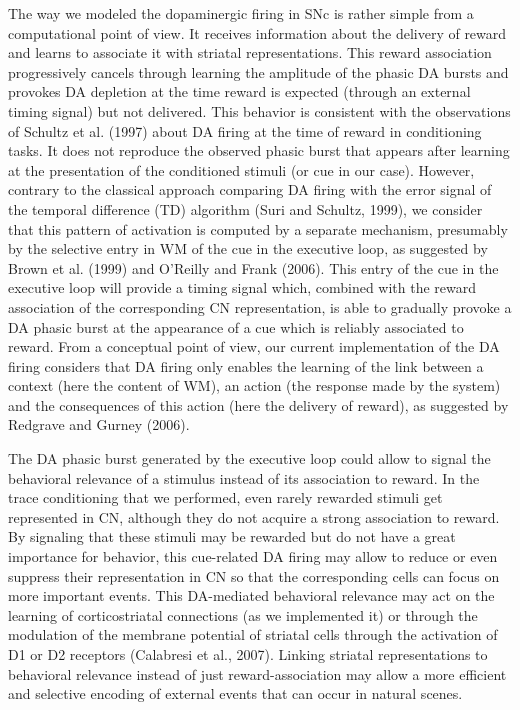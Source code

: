 \documentclass[
  11pt,
  a4paper,
]{scrbook}
\begin{document}
The way we modeled the dopaminergic firing in SNc is rather simple from
a computational point of view. It receives information about the
delivery of reward and learns to associate it with striatal
representations. This reward association progressively cancels through
learning the amplitude of the phasic DA bursts and provokes DA depletion
at the time reward is expected (through an external timing signal) but
not delivered. This behavior is consistent with the observations of
Schultz et al. (1997) about DA firing at the time of reward in
conditioning tasks. It does not reproduce the observed phasic burst that
appears after learning at the presentation of the conditioned stimuli
(or cue in our case). However, contrary to the classical approach
comparing DA firing with the error signal of the temporal difference
(TD) algorithm (Suri and Schultz, 1999), we consider that this pattern
of activation is computed by a separate mechanism, presumably by the
selective entry in WM of the cue in the executive loop, as suggested by
Brown et al. (1999) and O'Reilly and Frank (2006). This entry of the cue
in the executive loop will provide a timing signal which, combined with
the reward association of the corresponding CN representation, is able
to gradually provoke a DA phasic burst at the appearance of a cue which
is reliably associated to reward. From a conceptual point of view, our
current implementation of the DA firing considers that DA firing only
enables the learning of the link between a context (here the content of
WM), an action (the response made by the system) and the consequences of
this action (here the delivery of reward), as suggested by Redgrave and
Gurney (2006).

The DA phasic burst generated by the executive loop could allow to
signal the behavioral relevance of a stimulus instead of its association
to reward. In the trace conditioning that we performed, even rarely
rewarded stimuli get represented in CN, although they do not acquire a
strong association to reward. By signaling that these stimuli may be
rewarded but do not have a great importance for behavior, this
cue-related DA firing may allow to reduce or even suppress their
representation in CN so that the corresponding cells can focus on more
important events. This DA-mediated behavioral relevance may act on the
learning of corticostriatal connections (as we implemented it) or
through the modulation of the membrane potential of striatal cells
through the activation of D1 or D2 receptors (Calabresi et al., 2007).
Linking striatal representations to behavioral relevance instead of just
reward-association may allow a more efficient and selective encoding of
external events that can occur in natural scenes.
\end{document}
